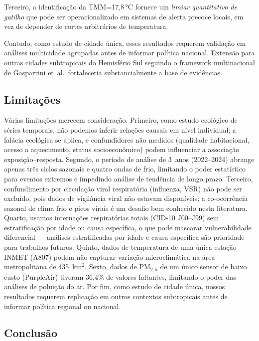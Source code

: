 \documentclass[12pt]{article}
\begin{document}
Terceiro, a identificação da TMM=17,8\,°C fornece um \emph{limiar
quantitativo de gatilho} que pode ser operacionalizado em sistemas
de alerta precoce locais, em vez de depender de cortes arbitrários
de temperatura.

Contudo, como estudo de cidade única, esses resultados requerem
validação em análises multicidade agrupadas antes de informar política
nacional. Extensão para outras cidades subtropicais do Hemisfério Sul
seguindo o framework multinacional de Gasparrini et~al.\ fortaleceria
substancialmente a base de evidências.

\subsection{Limitações}

Várias limitações merecem consideração. Primeiro, como estudo
ecológico de séries temporais, não podemos inferir relações causais
em nível individual; a falácia ecológica se aplica, e confundidores
não medidos (qualidade habitacional, acesso a aquecimento, status
socioeconômico) podem influenciar a associação exposição--resposta.
Segundo, o período de análise de 3~anos (2022--2024) abrange apenas
três ciclos sazonais e quatro ondas de frio, limitando o poder
estatístico para eventos extremos e impedindo análise de tendência
de longo prazo. Terceiro, confundimento por circulação viral
respiratória (influenza, VSR) não pode ser excluído, pois dados de
vigilância viral não estavam disponíveis; a co-ocorrência sazonal de
clima frio e picos virais é um desafio bem conhecido nesta literatura.
Quarto, usamos internações respiratórias totais (CID-10 J00--J99) sem
estratificação por idade ou causa específica, o que pode mascarar
vulnerabilidade diferencial --- análises estratificadas por idade e
causa específica são prioridade para trabalhos futuros. Quinto, dados
de temperatura de uma única estação INMET (A807) podem não capturar
variação microclimática na área metropolitana de 435~km$^2$. Sexto,
dados de PM$_{2,5}$ de um único sensor de baixo custo (PurpleAir)
tiveram 36,4\% de valores faltantes, limitando o poder das análises
de poluição do ar. Por fim, como estudo de cidade única, nossos
resultados requerem replicação em outros contextos subtropicais antes
de informar política regional ou nacional.

\subsection{Conclusão}
\end{document}
